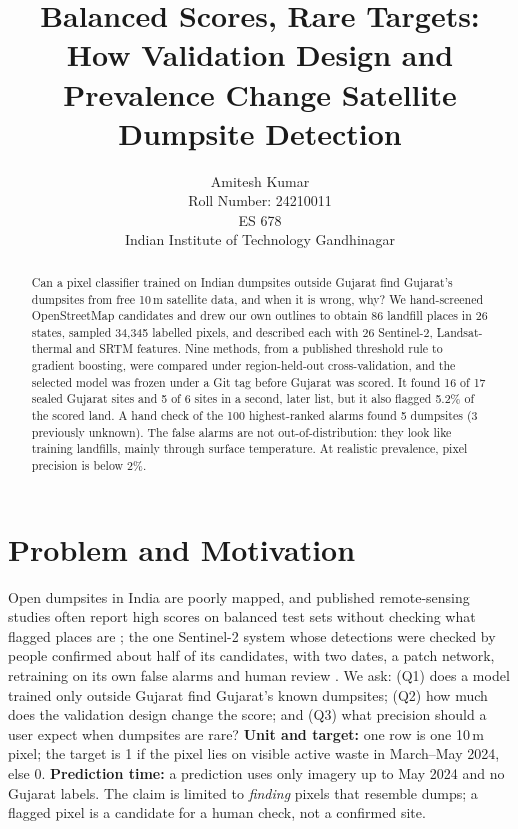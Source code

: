 \documentclass{article}
\title{Balanced Scores, Rare Targets: How Validation Design and Prevalence Change Satellite Dumpsite Detection}
\author{%
  Amitesh Kumar \\
  Roll Number: 24210011 \\
  ES 678 \\
  Indian Institute of Technology Gandhinagar
}
\begin{document}
\maketitle

\begin{abstract}
Can a pixel classifier trained on Indian dumpsites outside Gujarat find Gujarat's dumpsites from free 10\,m satellite data, and when it is wrong, why? We hand-screened OpenStreetMap candidates and drew our own outlines to obtain 86 landfill places in 26 states, sampled 34,345 labelled pixels, and described each with 26 Sentinel-2, Landsat-thermal and SRTM features. Nine methods, from a published threshold rule to gradient boosting, were compared under region-held-out cross-validation, and the selected model was frozen under a Git tag before Gujarat was scored. It found 16 of 17 sealed Gujarat sites and 5 of 6 sites in a second, later list, but it also flagged 5.2\% of the scored land. A hand check of the 100 highest-ranked alarms found 5 dumpsites (3 previously unknown). The false alarms are not out-of-distribution: they look like training landfills, mainly through surface temperature. At realistic prevalence, pixel precision is below 2\%.
\end{abstract}

\section{Problem and Motivation}
Open dumpsites in India are poorly mapped, and published remote-sensing studies often report high scores on balanced test sets without checking what flagged places are \citep{bhajantri2026}; the one Sentinel-2 system whose detections were checked by people confirmed about half of its candidates, with two dates, a patch network, retraining on its own false alarms and human review \citep{kruse2023}. We ask: (Q1) does a model trained only outside Gujarat find Gujarat's known dumpsites; (Q2) how much does the validation design change the score; and (Q3) what precision should a user expect when dumpsites are rare? \textbf{Unit and target:} one row is one 10\,m pixel; the target is 1 if the pixel lies on visible active waste in March--May 2024, else 0. \textbf{Prediction time:} a prediction uses only imagery up to May 2024 and no Gujarat labels. The claim is limited to \emph{finding} pixels that resemble dumps; a flagged pixel is a candidate for a human check, not a confirmed site.
\end{document}
